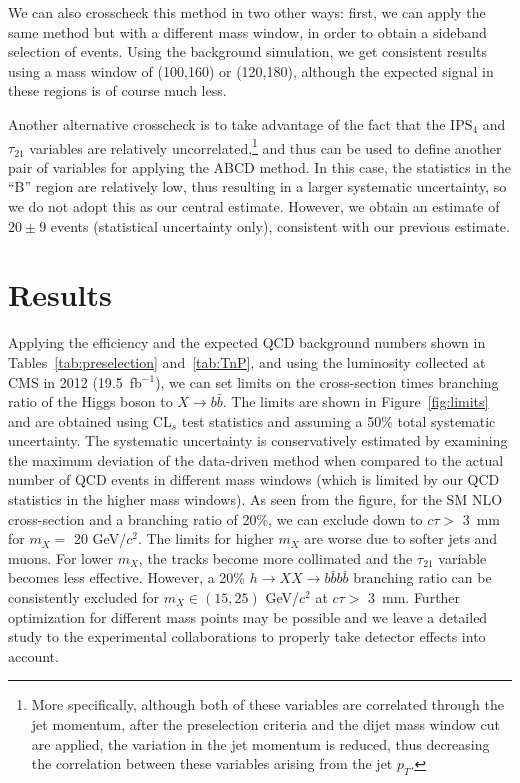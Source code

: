 \documentclass{JHEP3}
\newcommand{\IPS}{\textrm{IPS}}
\begin{document}
We can also crosscheck this method in two other ways: first, we can apply the same method but with a
different mass window, in order to obtain a sideband selection of events. Using the background
simulation, we get consistent results using a mass window of (100,160) or (120,180), although the
expected signal in these regions is of course much less.

Another alternative crosscheck is to take advantage of the fact that the $\IPS_{4}$ and $\tau_{21}$ variables
are relatively uncorrelated,\footnote{More specifically, although both of these variables are correlated
through the jet momentum, after the preselection criteria and the dijet mass window cut are applied, the variation in the jet momentum is
reduced, thus decreasing the correlation between these variables arising from the jet $p_T$.} and thus can be
used to define another pair of variables for applying the ABCD method. In this case, the statistics in the
``B'' region are relatively low, thus resulting in a larger systematic uncertainty, so we do not adopt this as
our central estimate. However, we obtain an estimate of $20 \pm 9$ events (statistical uncertainty only),
consistent with our previous estimate.


\section{Results}

Applying the efficiency and the expected QCD background numbers shown in Tables~\ref{tab:preselection}
and~\ref{tab:TnP}, and using the luminosity collected at CMS in 2012 (19.5~fb$^{-1}$), we can set limits on
the cross-section times branching ratio of the Higgs boson to $X\rightarrow b\bar{b}$. The limits are shown in
Figure~\ref{fig:limits} and are obtained using CL$_s$ test statistics and assuming a 50\% total systematic
uncertainty. The systematic uncertainty is conservatively estimated by examining the maximum deviation of the
data-driven method when compared to the actual number of QCD events in different mass windows (which is
limited by our QCD statistics in the higher mass windows). As seen from the figure, for the SM NLO
cross-section and a branching ratio of 20\%, we can exclude down to $c\tau >$ 3~mm for $m_X = $ 20
GeV/$c^2$. The limits for higher $m_X$ are worse due to softer jets and muons. For lower $m_X$, the tracks
become more collimated and the $\tau_{21}$ variable becomes less effective. However, a 20\% $h\rightarrow XX
\rightarrow b\bar{b}b\bar{b}$ branching ratio can be consistently excluded for $m_X\in (15,25)$ GeV/$c^2$ at
$c\tau >$ 3~mm. Further optimization for different mass points may be possible and we leave a detailed study
to the experimental collaborations to properly take detector effects into account.
\end{document}
